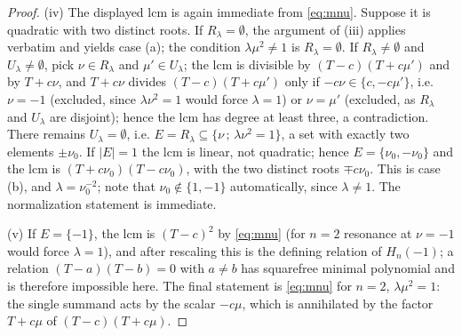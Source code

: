 \documentclass[11pt]{article}
\theoremstyle{definition}
\theoremstyle{remark}
\begin{document}
\begin{proof}
(iv) The displayed lcm is again immediate from \eqref{eq:mnu}. Suppose
it is quadratic with two distinct roots. If $R_\lambda = \emptyset$,
the argument of (iii) applies verbatim and yields case (a); the
condition $\lambda\mu^2 \neq 1$ is $R_\lambda = \emptyset$. If
$R_\lambda \neq \emptyset$ and $U_\lambda \neq \emptyset$, pick
$\nu \in R_\lambda$ and $\mu' \in U_\lambda$; the lcm is divisible by
$(T - c)(T + c\mu')$ and by $T + c\nu$, and $T + c\nu$ divides
$(T - c)(T + c\mu')$ only if $-c\nu \in \{c, -c\mu'\}$, i.e.
$\nu = -1$ (excluded, since $\lambda\nu^2 = 1$ would force
$\lambda = 1$) or $\nu = \mu'$ (excluded, as $R_\lambda$ and
$U_\lambda$ are disjoint); hence the lcm has degree at least three, a
contradiction. There remains $U_\lambda = \emptyset$, i.e.
$E = R_\lambda \subseteq \{\nu \,;\, \lambda\nu^2 = 1\}$, a set with
exactly two elements $\pm\nu_0$. If $|E| = 1$ the lcm is linear, not
quadratic; hence $E = \{\nu_0, -\nu_0\}$ and the lcm is
$(T + c\nu_0)(T - c\nu_0)$, with the two distinct roots $\mp c\nu_0$.
This is case (b), and $\lambda = \nu_0^{-2}$; note that
$\nu_0 \notin \{1, -1\}$ automatically, since $\lambda \neq 1$. The
normalization statement is immediate.

(v) If $E = \{-1\}$, the lcm is $(T - c)^2$ by \eqref{eq:mnu}
(for $n = 2$ resonance at $\nu = -1$ would force $\lambda = 1$), and
after rescaling this is the defining relation of $H_n(-1)$; a relation
$(T - a)(T - b) = 0$ with $a \neq b$ has squarefree minimal polynomial
and is therefore impossible here. The final statement is
\eqref{eq:mnu} for $n = 2$, $\lambda\mu^2 = 1$: the single summand acts
by the scalar $-c\mu$, which is annihilated by the factor $T + c\mu$ of
$(T - c)(T + c\mu)$.
\end{proof}
\end{document}

